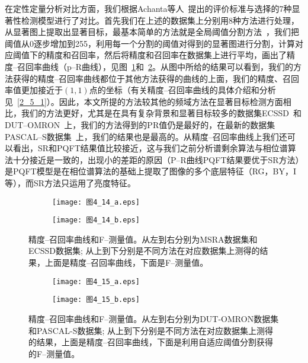 在定性定量分析对比方面，我们根据Achanta等人~\cite{AchantaCVPR2009Frequency}提出的评价标准与选择的7种显著性检测模型进行了对比。首先我们在上述的数据集上分别用8种方法进行处理，从显著图上提取出显著目标，最基本简单的方法就是全局阈值分割方法~\cite{王岩2012注意}，我们把阈值从0逐步增加到255，利用每一个分割的阈值对得到的显著图进行分割，计算对应阈值下的精度和召回率，然后将精度和召回率在数据集上进行平均，画出了精度--召回率曲线（p--R曲线），见图~\ref{图4_14}和~\ref{图4_15}。从图中所给的结果可以看到，我们的方法获得的精度--召回率曲线都位于其他方法获得的曲线的上面，我们的精度、召回率值更加接近于$(1,1)$点的坐标（有关精度--召回率曲线的具体介绍和分析见~\ref{2_5_1}）。因此，本文所提的方法较其他的频域方法在显著目标检测方面相比，我们的方法更好，尤其是在具有复杂背景和显著目标较多的数据集ECSSD~\cite{YanQiongCVPR2013Hierarchical}和DUT--OMRON~\cite{YangChuanCVPR2013Manifold}上，我们的方法得到的PR值仍是最好的，在最新的数据集PASCAL--S数据集~\cite{LiYinCVPR2014Secrets}上，我们的结果也是最高的。从精度--召回率曲线上我们还可以看出，SR和PQFT结果值比较接近，这与我们之前分析谱剩余算法与相位谱算法十分接近是一致的，出现小的差距的原因（P--R曲线PQFT结果要优于SR方法）是PQFT模型是在相位谱算法的基础上提取了图像的多个底层特征（RG，BY，I等），而SR方法只运用了亮度特征。
\begin{figure}[h]
  \centering%
  \begin{subfigure}{5.5cm}
    \texttt{[image: 图4\_14\_a.eps]}
    \caption{}
  \end{subfigure}
  \hspace{4em}%
  \begin{subfigure}{0.45\textwidth}
    \texttt{[image: 图4\_14\_b.eps]}
    \caption{}
  \end{subfigure}
  \caption{精度--召回率曲线和F--测量值。从左到右分别为MSRA数据集和ECSSD数据集; 从上到下分别是不同方法在对应数据集上测得的结果，上面是精度--召回率曲线，下面是F--测量值。}
  \label{图4_14}
\end{figure}
\begin{figure}[h]
  \centering%
  \begin{subfigure}{5.5cm}
    \texttt{[image: 图4\_15\_a.eps]}
    \caption{}
  \end{subfigure}
  \hspace{4em}%
  \begin{subfigure}{0.45\textwidth}
    \texttt{[image: 图4\_15\_b.eps]}
    \caption{}
  \end{subfigure}
  \caption{精度--召回率曲线和F--测量值。从左到右分别为DUT-OMRON数据集和PASCAL-S数据集; 从上到下分别是不同方法在对应数据集上测得的结果，上面是精度--召回率曲线，下面是利用自适应阈值分割获得的F--测量值。}
  \label{图4_15}
\end{figure}


